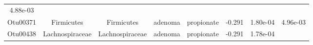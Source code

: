 \documentclass[11pt,]{article}
\begin{document}
\begin{longtable}[]{@{}cccccccc@{}}
\begin{minipage}[t]{0.08\columnwidth}
4.88e-03\strut
\end{minipage}\tabularnewline
\begin{minipage}[t]{0.08\columnwidth}\centering\strut
Otu00371\strut
\end{minipage} & \begin{minipage}[t]{0.15\columnwidth}\centering\strut
Firmicutes\strut
\end{minipage} & \begin{minipage}[t]{0.15\columnwidth}\centering\strut
Firmicutes\strut
\end{minipage} & \begin{minipage}[t]{0.08\columnwidth}\centering\strut
adenoma\strut
\end{minipage} & \begin{minipage}[t]{0.09\columnwidth}\centering\strut
propionate\strut
\end{minipage} & \begin{minipage}[t]{0.07\columnwidth}\centering\strut
-0.291\strut
\end{minipage} & \begin{minipage}[t]{0.08\columnwidth}\centering\strut
1.80e-04\strut
\end{minipage} & \begin{minipage}[t]{0.08\columnwidth}\centering\strut
4.96e-03\strut
\end{minipage}\tabularnewline
\begin{minipage}[t]{0.08\columnwidth}\centering\strut
Otu00438\strut
\end{minipage} & \begin{minipage}[t]{0.15\columnwidth}\centering\strut
Lachnospiraceae\strut
\end{minipage} & \begin{minipage}[t]{0.15\columnwidth}\centering\strut
Lachnospiraceae\strut
\end{minipage} & \begin{minipage}[t]{0.08\columnwidth}\centering\strut
adenoma\strut
\end{minipage} & \begin{minipage}[t]{0.09\columnwidth}\centering\strut
propionate\strut
\end{minipage} & \begin{minipage}[t]{0.07\columnwidth}\centering\strut
-0.291\strut
\end{minipage} & \begin{minipage}[t]{0.08\columnwidth}\centering\strut
1.78e-04\strut
\end{minipage} & \begin{minipage}[t]{0.08\columnwidth}\centering\strut

\end{minipage}
\end{longtable}
\end{document}
